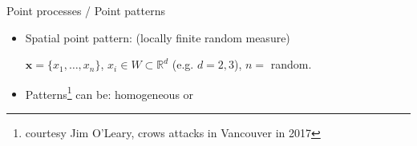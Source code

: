 \documentclass[serif]{beamer}
\newcommand{\tr}[1]{
	{\color{red}{ #1}}
}
\newcommand{\bx}{\mathbf{x}}
\newcommand{\R}{\mathbb R}
\begin{document}
\begin{frame}{Point processes / Point patterns}

\vspace*{-.5cm}

\begin{itemize}
	\item Spatial point pattern: (locally finite random measure)\\
\medskip

	$\bx = \{x_1,\dots,x_n\}$, $x_i \in W \subset \R^d$ (e.g. $d=2,3$), $n=$ random. \\

	\item Patterns\footnote{courtesy Jim O'Leary, crows attacks in Vancouver in 2017} can be: homogeneous or \only<2>{\tr{inhomogeneous}}

	\vspace*{-1.5cm}
	

\end{itemize}
\end{frame}
\end{document}
